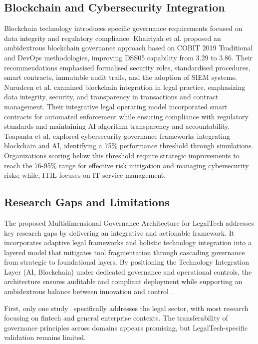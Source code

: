 \documentclass{IET-Conf-Paper}
\begin{document}
    \subsection{Blockchain and Cybersecurity Integration}
     Blockchain technology introduces specific governance requirements focused on data integrity and regulatory compliance. Khairiyah et al. \cite{Khairiyah2025Ambidextrous} proposed an ambidextrous blockchain governance approach based on COBIT 2019 Traditional and DevOps methodologies, improving DSS05 capability from 3.29 to 3.86. Their recommendations emphasised formalised security roles, standardised procedures, smart contracts, immutable audit trails, and the adoption of SIEM systems.
    Nurudeen et al.\cite{nurudeen2024} examined blockchain integration in legal practice, emphasizing data integrity, security, and transparency in transactions and contract management. Their integrative legal operating model incorporated smart contracts for automated enforcement while ensuring compliance with regulatory standards and maintaining AI algorithm transparency and accountability.
    Toapanta et al.\cite{Toapanta2025Perspectives} explored cybersecurity governance frameworks integrating blockchain and AI, identifying a 75\% performance threshold through simulations. Organizations scoring below this threshold require strategic improvements to reach the 76-95\% range for effective risk mitigation and managing cybersecurity risks; while, ITIL focuses on IT service management.
    
    \subsection{Research Gaps and Limitations}
    The proposed Multidimensional Governance Architecture for LegalTech addresses key research gaps by delivering an integrative and actionable framework. It incorporates adaptive legal frameworks \cite{akpobome2024impact} and holistic technology integration \cite{almutairi2024integrating} into a layered model that mitigates tool fragmentation \cite{mustafa2024blockchain} through cascading governance from strategic to foundational layers. By positioning the Technology Integration Layer (AI, Blockchain) under dedicated governance and operational controls, the architecture ensures auditable and compliant deployment while supporting an ambidextrous balance between innovation and control \cite{Lestari2025Designing}.
    
    First, only one study~\cite{nurudeen2024} specifically addresses the legal sector, with most research focusing on fintech and general enterprise contexts. The transferability of governance principles across domains appears promising, but LegalTech-specific validation remains limited.
    
\end{document}
